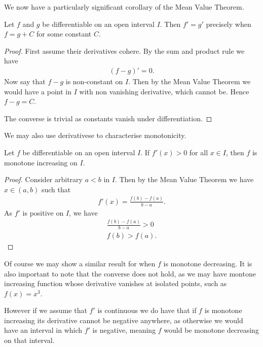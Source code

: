 \documentclass[]{article}
\begin{document}
We now have a particularly significant corollary of the Mean Value Theorem.

\begin{thm}
		Let $f$ and $g$ be differentiable on an open interval $I$. Then $f' = g'$ precisely when $f = g + C$ for some constant $C$.
\end{thm}

\begin{proof}
		First assume their derivatives cohere. By the sum and product rule we have
		\begin{align*}
				(f-g)' = 0.
		\end{align*}
		Now say that $f-g$ is non-constant on $I$. Then by the Mean Value Theorem we would have a point in $I$ with non vanishing derivative, which cannot be. Hence $f-g = C$.

		The converse is trivial as constants vanish under differentiation.
\end{proof}

We may also use derivativese to characterise monotonicity.

\begin{thm}
		Let $f$ be differentiable on an open interval $I$. If $f'(x) > 0$ for all $x \in I$, then $f$ is monotone increasing on $I$.
\end{thm}

\begin{proof}
		Consider arbitrary $a < b$ in $I$. Then by the Mean Value Theorem we have $x \in (a,b)$ such that
		\begin{align*}
				f'(x) = \frac{f(b) - f(a)}{b - a}.
		\end{align*}
		As $f'$ is positive on $I$, we have  
		\begin{align*}
				\frac{f(b) - f(a)}{b - a} > 0 \\
				f(b) > f(a).
		\end{align*}
\end{proof}

Of course we may show a similar result for when $f$ is monotone decreasing. It is also important to note that the converse does not hold, as we may have montone increasing function whose derivative vanishes at isolated points, such as $f(x) = x^3$.

However if we assume that $f'$ is continuous we do have that if $f$ is monotone increasing its derivative cannot be negative anywhere, as otherwise we would have an interval in which $f'$ is negative, meaning $f$ would be monotone decreasing on that interval.
\end{document}

